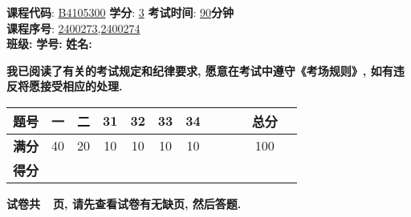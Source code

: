 \documentclass[zihao=5,noanswers]{BHCexam}
\begin{document}
\renewcommand{\O}{\mathcal{O}}



\maketitle

\begin{flushleft}
 \qquad\kaishu \textbf{课程代码}: \underline{\hspace{2ex}B4105300\hspace{2ex}} \quad\kaishu \textbf{学分}: \underline{\hspace{5ex}3\hspace{5ex}} \quad \kaishu \textbf{考试时间}: \underline{\hspace{3ex}90\hspace{3ex}}\kaishu \textbf{分钟}\\
 \qquad\kaishu \textbf{课程序号}: \underline{\hspace{25ex}2400273,2400274\hspace{25ex}}\\
 \qquad\vspace{1ex}
 \kaishu \textbf{班级:} \underline{\hspace{15ex}} \quad
 \kaishu \textbf{学号:} \underline{\hspace{15ex}} \quad
 \kaishu \textbf{姓名:} \underline{\hspace{15ex}} \quad
\end{flushleft}

 {\small \kaishu \textbf{我已阅读了有关的考试规定和纪律要求, 愿意在考试中遵守《考场规则》, 如有违反将愿接受相应的处理.}}
\begin{center}
   \setlength{\tabcolsep}{3mm}
   \begin{tabular}{*{12}{|c}|}
      \hline \textbf{题号} & 一 & 二 & 31 & 32 & 33 & 34 &   &   & &  总分 \\
      \hline \textbf{满分}& 40 & 20 & 10 & 10 & 10 & 10  &  &  &  & 100\\
      \hline \textbf{得分}&&&&&&&&&& \\
      \hline
   \end{tabular}
\end{center}

 {\small \textbf{试卷共~\numpages~页, 请先查看试卷有无缺页, 然后答题.}}
\end{document}
